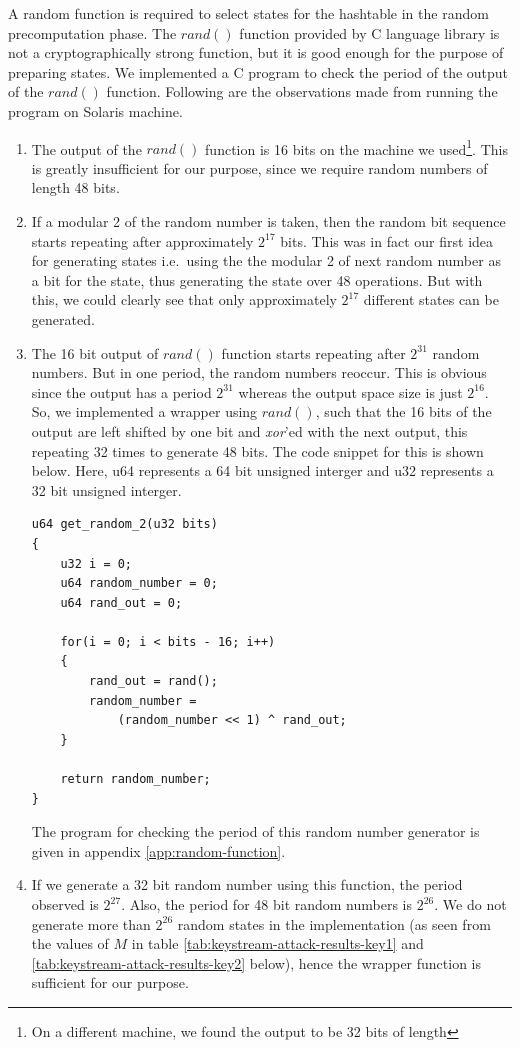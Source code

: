 A random function is required to select states for the hashtable in the random precomputation phase. The $rand()$ function provided by C language library is not a cryptographically strong function, but it is good enough for the purpose of preparing states. We implemented a C program to check the period of the output of the $rand()$ function. Following are the observations made from running the program on Solaris machine.

\begin{enumerate}
\item The output of the $rand()$ function is 16 bits on the machine we used\footnote{On a different machine, we found the output to be 32 bits of length}. This is greatly insufficient for our purpose, since we require random numbers of length 48 bits.
\item If a modular 2 of the random number is taken, then the random bit sequence starts repeating after approximately $2^{17}$ bits. This was in fact our first idea for generating states i.e.~using the the modular 2 of next random number as a bit for the state, thus generating the state over 48 operations. But with this, we could clearly see that only approximately $2^{17}$ different states can be generated.
\item The 16 bit output of $rand()$ function starts repeating after $2^{31}$ random numbers. But in one period, the random numbers reoccur. This is obvious since the output has a period $2^{31}$ whereas the output space size is just $2^{16}$. So, we implemented a wrapper using $rand()$, such that the 16 bits of the output are left shifted by one bit and \textit{xor}'ed with the next output, this repeating 32 times to generate 48 bits. The code snippet for this is shown below. Here, u64 represents a 64 bit unsigned interger and u32 represents a 32 bit unsigned interger.
\begin{lstlisting}[frame=tb]
u64 get_random_2(u32 bits)
{
	u32 i = 0;
	u64 random_number = 0;
	u64 rand_out = 0;

	for(i = 0; i < bits - 16; i++)
	{
		rand_out = rand();
		random_number = 
			(random_number << 1) ^ rand_out;
	}

	return random_number;
}
\end{lstlisting}
The program for checking the period of this random number generator is given in appendix \ref{app:random-function}.
\item If we generate a 32 bit random number using this function, the period observed is $2^{27}$. Also, the period for 48 bit random numbers is $2^{26}$. We do not generate more than $2^{26}$ random states in the implementation (as seen from the values of $M$ in table \ref{tab:keystream-attack-results-key1} and \ref{tab:keystream-attack-results-key2} below), hence the wrapper function is sufficient for our purpose.
\end{enumerate}

